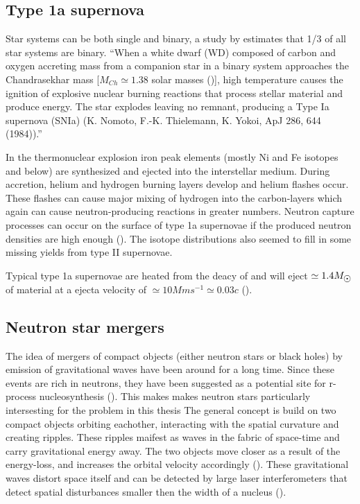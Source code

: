 \begin{figure}
  
\end{figure}
\FloatBarrier

\subsection{Type 1a supernova}
Star systems can be both single and binary, a study by  estimates that 1/3 of all star systems are binary.
``When a white dwarf (WD) composed of carbon and oxygen accreting mass from a companion star in
a binary system approaches the Chandrasekhar mass [$M_{Ch} \simeq 1.38$ solar masses (\msol)], high temperature
causes the ignition of explosive nuclear burning reactions that process stellar material and produce energy.
The star explodes leaving no remnant, producing a Type Ia supernova (SNIa) (K. Nomoto, F.-K. Thielemann, K. Yokoi, ApJ 286, 644 (1984)).''

In the thermonuclear explosion iron peak elements (mostly Ni and Fe isotopes and below) are synthesized and ejected into the interstellar medium.
During accretion, helium and hydrogen burning layers develop and helium flashes occur.
These flashes can cause major mixing of hydrogen into the carbon-layers which again can cause neutron-producing reactions in greater numbers.
Neutron capture processes can occur on the surface of type 1a supernovae if the produced neutron densities are high enough ().
The isotope distributions also seemed to fill in some missing yields from type II supernovae.

Typical type 1a supernovae are heated from the deacy of  and will eject $\simeq 1.4 \msol$ of material at a ejecta velocity of $\simeq10 Mm s^{-1} \simeq 0.03c$ ().

\subsection{Neutron star mergers}
The idea of mergers of compact objects (either neutron stars or black holes) by emission of gravitational waves have been around for a long time. Since these events are rich in neutrons, they have been suggested as a potential site for r-process nucleosynthesis
().
This makes makes neutron stars particularly intersesting for the problem in this thesis 
The general concept is build on two compact objects orbiting eachother, interacting with the spatial curvature and creating ripples.
These ripples maifest as waves in the fabric of space-time and carry gravitational energy away.
The two objects move closer as a result of the energy-loss, and increases the orbital velocity accordingly ().
These gravitational waves distort space itself and can be detected by large laser interferometers that detect spatial disturbances smaller then the width of a nucleus ().

